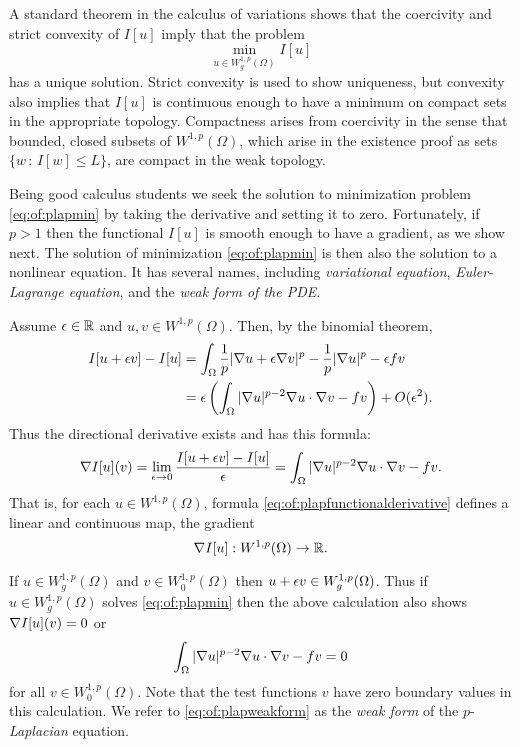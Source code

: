 A standard theorem in the calculus of variations \citep[Theorem 8.2.2]{Evans2010} shows that the coercivity and strict convexity of $I[u]$ imply that the problem
\begin{equation}
\min_{u \in W_g^{1,p}(\Omega)} I[u] \label{eq:of:plapmin}
\end{equation}
has a unique solution.  Strict convexity is used to show uniqueness, but convexity also implies that $I[u]$ is continuous enough to have a minimum on compact sets in the appropriate topology.  Compactness arises from coercivity in the sense that bounded, closed subsets of $W^{1,p}(\Omega)$, which arise in the existence proof as sets $\{w\,:\,I[w] \le L\}$, are compact in the weak topology.

Being good calculus students we seek the solution to minimization problem \eqref{eq:of:plapmin} by taking the derivative and setting it to zero.  Fortunately, if $p>1$ then the functional $I[u]$ is smooth enough to have a gradient, as we show next.  The solution of minimization \eqref{eq:of:plapmin} is then also the solution to a nonlinear equation.  It has several names, including \emph{variational equation}, \emph{Euler-Lagrange equation}, and the \emph{weak form of the PDE}.

Assume $\epsilon\in \mathbb{R}$ and $u,v \in W^{1,p}(\Omega)$.  Then, by the binomial theorem,
\begin{align*}
I[u+\epsilon v] - I[u] &= \int_\Omega \frac{1}{p} |\nabla u + \epsilon \nabla v|^p - \frac{1}{p} |\nabla u|^p - \epsilon f v \\
   &= \epsilon \left(\int_\Omega |\nabla u|^{p-2} \nabla u \cdot \nabla v - f v\right) + O(\epsilon^2).
\end{align*}
Thus the directional derivative exists and has this formula:
\begin{equation}
\nabla I[u](v) = \lim_{\epsilon\to 0} \frac{I[u+\epsilon v] - I[u]}{\epsilon} = \int_\Omega |\nabla u|^{p-2} \nabla u \cdot \nabla v - f v. \label{eq:of:plapfunctionalderivative}
\end{equation}
That is, for each $u \in W^{1,p}(\Omega)$, formula \eqref{eq:of:plapfunctionalderivative} defines a linear and continuous map, the gradient
   $$\nabla I[u] : W^{1,p}(\Omega) \to \mathbb{R}.$$

If $u \in W_g^{1,p}(\Omega)$ and $v\in W_0^{1,p}(\Omega)$ then $u+\epsilon v\in W_g^{1,p}(\Omega)$.  Thus if $u \in W_g^{1,p}(\Omega)$ solves \eqref{eq:of:plapmin} then the above calculation also shows $\nabla I[u](v)=0$ or
\begin{equation}
\int_\Omega |\nabla u|^{p-2} \nabla u \cdot \nabla v - f v = 0 \label{eq:of:plapweakform}
\end{equation}
for all $v\in W_0^{1,p}(\Omega)$.  Note that the test functions $v$ have zero boundary values in this calculation.  We refer to \eqref{eq:of:plapweakform} as the \emph{weak form} of the $p$-\emph{Laplacian} equation.

